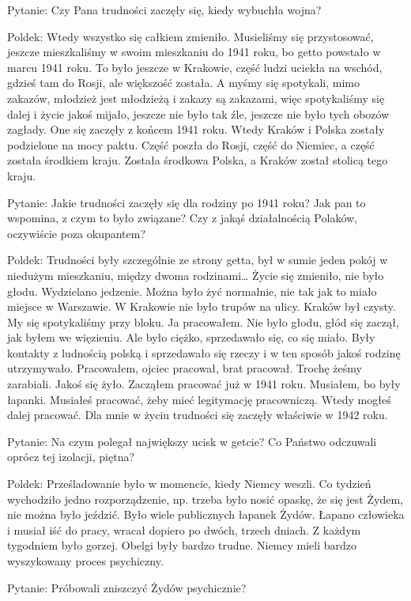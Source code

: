 Pytanie: Czy Pana trudności zaczęły się, kiedy wybuchła wojna? 

Poldek: Wtedy wszystko się całkiem zmieniło. Musieliśmy się przystosować, jeszcze mieszkaliśmy w swoim mieszkaniu do 1941 roku, bo getto powstało w marcu 1941 roku. To było jeszcze w Krakowie, część ludzi uciekła na wschód, gdzieś tam do Rosji, ale większość została. A myśmy się spotykali, mimo zakazów, młodzież jest młodzieżą i zakazy są zakazami, więc spotykaliśmy się dalej i życie jakoś mijało, jeszcze nie było tak źle, jeszcze nie było tych obozów zagłady. One się zaczęły z końcem 1941 roku. Wtedy Kraków i Polska zostały podzielone na mocy paktu. Część poszła do Rosji, część do Niemiec, a część została środkiem kraju. Została środkowa Polska, a Kraków został stolicą tego kraju.  

Pytanie: Jakie trudności zaczęły się dla rodziny po 1941 roku? Jak pan to wspomina, z czym to było związane? Czy z jakąś działalnością Polaków, oczywiście poza okupantem? 

Poldek: Trudności były szczególnie ze strony getta, był w sumie jeden pokój w niedużym mieszkaniu, między dwoma rodzinami… Życie się zmieniło, nie było głodu. Wydzielano jedzenie. Można było żyć normalnie, nie tak jak to miało miejsce w Warszawie. W Krakowie nie było trupów na ulicy. Kraków był czysty. My się spotykaliśmy przy bloku. Ja pracowałem. Nie było głodu, głód się zaczął, jak byłem we więzieniu. Ale było ciężko, sprzedawało się, co się miało. Były kontakty z ludnością polską i sprzedawało się rzeczy i w ten sposób jakoś rodzinę utrzymywało. Pracowałem, ojciec pracował, brat pracował. Trochę żeśmy zarabiali. Jakoś się żyło. Zacząłem pracować już w 1941 roku. Musiałem, bo były łapanki. Musiałeś pracować, żeby mieć legitymację pracowniczą. Wtedy mogłeś dalej pracować. Dla mnie w życiu trudności się zaczęły właściwie w 1942 roku.  

Pytanie: Na czym polegał największy ucisk w getcie? Co Państwo odczuwali oprócz tej izolacji, piętna?  

Poldek: Prześladowanie było w momencie, kiedy Niemcy weszli. Co tydzień wychodziło jedno rozporządzenie, np. trzeba było nosić opaskę, że się jest Żydem, nie można było jeździć. Było wiele publicznych łapanek Żydów. Łapano człowieka i musiał iść do pracy, wracał dopiero po dwóch, trzech dniach. Z każdym tygodniem było gorzej. Obelgi były bardzo trudne. Niemcy mieli bardzo wyszykowany proces psychiczny. 

Pytanie: Próbowali zniszczyć Żydów psychicznie?  

